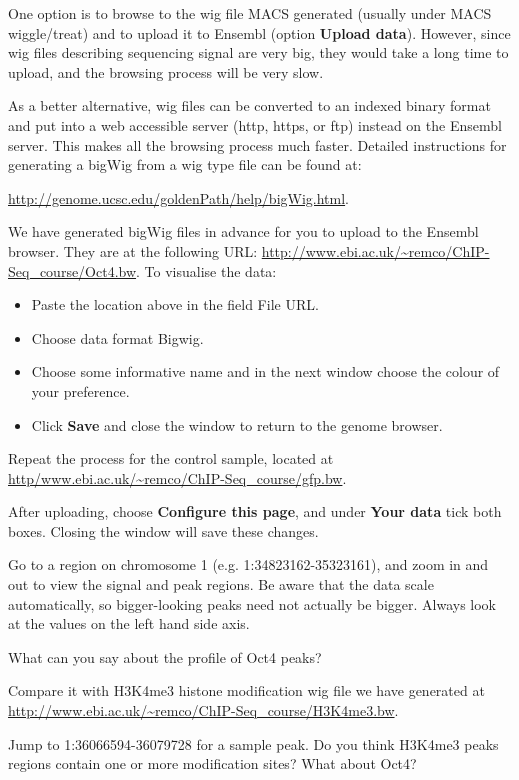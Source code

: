 \begin{note}
One option is to browse to the wig file MACS generated (usually under MACS wiggle/treat) and to upload it to Ensembl (option \textbf{Upload data}). However, since wig files describing sequencing signal are very big, they would take a long time to upload, and the browsing process will be very slow.

As a better alternative, wig files can be converted to an indexed binary format and put into a web accessible server (http, https, or ftp) instead on the Ensembl server. This makes all the browsing process much faster. Detailed instructions for generating a bigWig from a wig type file can be found at:

\url{http://genome.ucsc.edu/goldenPath/help/bigWig.html}.

\end{note}

\begin{steps}
We have generated bigWig files in advance for you to upload to the Ensembl browser. They are at the following URL: \url{http://www.ebi.ac.uk/~remco/ChIP-Seq_course/Oct4.bw}. To visualise the data:
\begin{itemize}
	\item Paste the location above in the field File URL. 
	\item Choose data format Bigwig. 
	\item Choose some informative name and in the next window choose the colour of your preference. 
	\item Click \textbf{Save} and close the window to return to the genome browser. 
\end{itemize}
Repeat the process for the control sample, located at \url{http/www.ebi.ac.uk/~remco/ChIP-Seq_course/gfp.bw}.
 
After uploading, choose \textbf{Configure this page}, and under \textbf{Your data} tick both boxes. Closing the window will save these changes.

Go to a region on chromosome 1 (e.g. 1:34823162-35323161), and zoom in and out to view the signal and peak regions. Be aware that the data scale automatically, so bigger-looking peaks need not actually be bigger. Always look at the values on the left hand side axis.
\end{steps}

\begin{questions}
What can you say about the profile of Oct4 peaks? 

\vspace{2cm}

Compare it with H3K4me3 histone modification wig file we have generated at 
\url{http://www.ebi.ac.uk/~remco/ChIP-Seq_course/H3K4me3.bw}. 

\vspace{2cm}

Jump to 1:36066594-36079728 for a sample peak. Do you think H3K4me3 peaks regions contain one or more modification sites? What about Oct4?

\vspace{2cm}
\end{questions}

